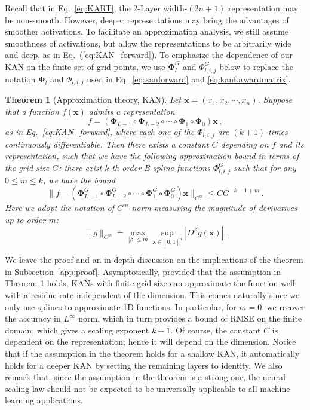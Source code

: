 \documentclass[12pt]{caltech_thesis}
\newtheorem{theorem}{Theorem}[section]
\numberwithin{equation}{section}
\begin{document}
Recall that in Eq.~\eqref{eq:KART}, the 2-Layer width-$(2n+1)$ representation may be non-smooth. However, deeper representations may bring the advantages of smoother activations. To facilitate an approximation analysis, we still assume smoothness of activations, but allow the representations to be arbitrarily wide and deep, as in Eq.~(\ref{eq:KAN_forward}). To emphasize the dependence of our KAN on the finite set of grid points, we use $\mathbf{\Phi}_l^G$ and $\Phi_{l,i,j}^G$ below to replace the notation $\mathbf{\Phi}_l$ and $\Phi_{l,i,j}$ used in Eq.~\eqref{eq:kanforward} and  \eqref{eq:kanforwardmatrix}.
\begin{theorem}[Approximation theory, KAN]\label{approx thm}
Let $\mathbf{x}=(x_1,x_2,\cdots,x_n)$.
    Suppose that a function $f(\mathbf{x})$ admits a representation  \begin{equation}\label{fkan}
    f = (\mathbf{\Phi}_{L-1}\circ\mathbf{\Phi}_{L-2}\circ\cdots\circ\mathbf{\Phi}_{1}\circ\mathbf{\Phi}_{0})\mathbf{x}\,,
\end{equation}
 as in Eq.~\eqref{eq:KAN_forward}, where each one of the $\Phi_{l,i,j}$ are  $(k+1)$-times continuously differentiable. Then there exists a constant $C$ depending on $f$ and its representation, such that we have the following approximation bound in terms of the grid size $G$: there exist $k$-th order B-spline functions $\Phi_{l,i,j}^G$ such that for any $0\leq m\leq k$, we have the bound \begin{equation}\label{appro bound}
    \|f-(\mathbf{\Phi}^G_{L-1}\circ\mathbf{\Phi}^G_{L-2}\circ\cdots\circ\mathbf{\Phi}^G_{1}\circ\mathbf{\Phi}^G_{0})\mathbf{x}\|_{C^m}\leq CG^{-k-1+m}\,.
\end{equation}
Here we adopt the notation of $C^m$-norm measuring the magnitude of derivatives up to order $m$: $$
\|g\|_{C^m}=\max _{|\beta| \leq m} \sup _{\mathbf{x}\in [0,1]^n}\left|D^\beta g(\mathbf{x})\right| .
$$
 
\end{theorem}

We leave the proof and an in-depth discussion on the implications of the theorem in Subsection~\ref{app:proof}. Asymptotically, provided that the assumption in Theorem \ref{approx thm} holds, KANs with finite grid size can approximate the function well with a residue rate independent of the dimension. This comes naturally since we only use splines to approximate 1D functions.  In particular, for $m=0$, we recover the accuracy in $L^\infty$ norm, which in turn provides a bound of RMSE on the finite domain, which gives a scaling exponent $k+1$. Of course, the constant $C$ is dependent on the representation; hence it will depend on the dimension. Notice that if the assumption in the theorem holds for a shallow KAN, it automatically holds for a deeper KAN by setting the remaining layers to identity. We also remark that: since the assumption in the theorem is a  strong one, the neural scaling law should not be expected to be universally applicable to all machine learning applications. 
\end{document}
